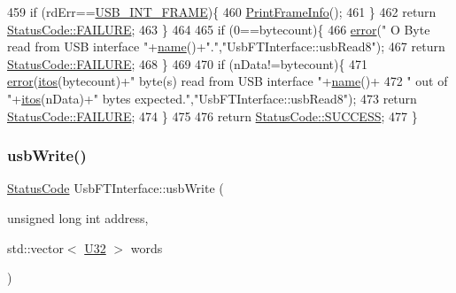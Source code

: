 \begin{DoxyCode}
459     \textcolor{keywordflow}{if} (rdErr==\hyperlink{LALUsbML_8h_a68260f9cf3649507d12904cfa1592c11afd1c409187b1dfd3d66887a5e07e7ed3}{USB\_INT\_FRAME})\{
460       \hyperlink{LALUsbML_8h_ab3398c17204ba7fb4b47eb9bbf4ba94e}{PrintFrameInfo}();
461     \} 
462     \textcolor{keywordflow}{return} \hyperlink{classStatusCode_a6f565cbeadc76d14c72f047e5e85eb4ba3da73d4c469762eb9d3c960368252b26}{StatusCode::FAILURE};
463   \}
464   
465   \textcolor{keywordflow}{if} (0==bytecount)\{
466     \hyperlink{classObject_a204a95f57818c0f811933917a30eff45}{error}(\textcolor{stringliteral}{" O Byte read from USB interface "}+\hyperlink{classObject_a300f4c05dd468c7bb8b3c968868443c1}{name}()+\textcolor{stringliteral}{"."},\textcolor{stringliteral}{"UsbFTInterface::usbRead8"});
467     \textcolor{keywordflow}{return} \hyperlink{classStatusCode_a6f565cbeadc76d14c72f047e5e85eb4ba3da73d4c469762eb9d3c960368252b26}{StatusCode::FAILURE};
468   \}
469 
470   \textcolor{keywordflow}{if} (nData!=bytecount)\{
471     \hyperlink{classObject_a204a95f57818c0f811933917a30eff45}{error}(\hyperlink{Tools_8h_af330027dbdafb9a30768b3613c553e60}{itos}(bytecount)+\textcolor{stringliteral}{" byte(s) read from USB interface "}+\hyperlink{classObject_a300f4c05dd468c7bb8b3c968868443c1}{name}()+
472             \textcolor{stringliteral}{" out of "}+\hyperlink{Tools_8h_af330027dbdafb9a30768b3613c553e60}{itos}(nData)+\textcolor{stringliteral}{" bytes expected."},\textcolor{stringliteral}{"UsbFTInterface::usbRead8"});
473     \textcolor{keywordflow}{return} \hyperlink{classStatusCode_a6f565cbeadc76d14c72f047e5e85eb4ba3da73d4c469762eb9d3c960368252b26}{StatusCode::FAILURE};    
474   \}
475 
476   \textcolor{keywordflow}{return} \hyperlink{classStatusCode_a6f565cbeadc76d14c72f047e5e85eb4badd0da38d3ba0d922efd1f4619bc37ad8}{StatusCode::SUCCESS};
477 \}
\end{DoxyCode}
\mbox{\label{classUsbFTInterface_ab7bf021f1fa3af385234e639c84827ef}} 
\subsubsection{\texorpdfstring{usb\+Write()}{usbWrite()}}
{\footnotesize\ttfamily \hyperlink{classStatusCode}{Status\+Code} Usb\+F\+T\+Interface\+::usb\+Write (\begin{DoxyParamCaption}\item[{unsigned long int}]{address,  }\item[{std\+::vector$<$ \hyperlink{classUsbFTInterface_aee2201fe4d977aa03568fa8dbacc39ba}{U32} $>$}]{words }\end{DoxyParamCaption})}

